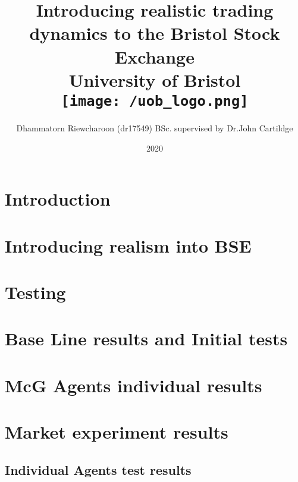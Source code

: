 \documentclass[12pt]{report}
\title{
{Introducing realistic trading dynamics to the Bristol Stock Exchange}\\
{\large University of Bristol}\\
{\texttt{[image: /uob\_logo.png]}}
}
\author{Dhammatorn Riewcharoon (dr17549) BSc. supervised by Dr.John Cartildge }
\date{2020}
\begin{document}
\maketitle
\newpage
\tableofcontents{}
\newpage

\chapter{Introduction}


\chapter{Introducing realism into BSE} 


\chapter{Testing} 


\chapter{Base Line results and Initial tests} 


\chapter{McG Agents individual results} 


\chapter{Market experiment results} 



\begin{appendices}
\chapter{Individual Agents test results}

\end{appendices}
\end{document}

